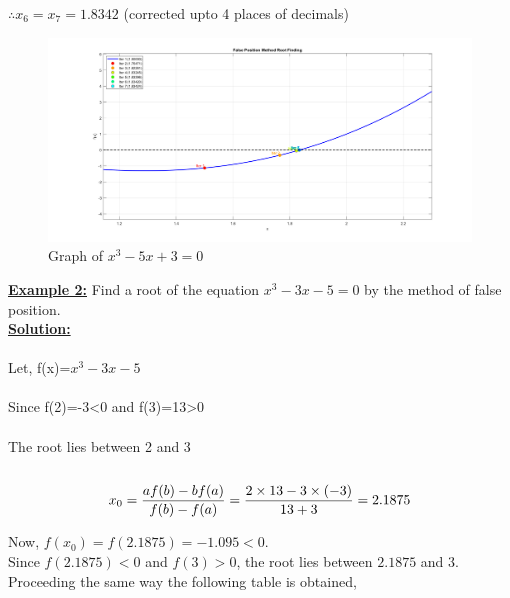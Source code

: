 \documentclass[12pt,a4paper]{article}
\begin{document}
		
		
		$\therefore x_6 = x_7 = 1.8342$ (corrected upto 4 places of decimals)
		
		\begin{figure}[h]
			\centering
			\includegraphics[width=1.2\textwidth]{False_ex01.png} %
			\caption{Graph of $x^3 - 5x + 3 = 0$}
			\label{fig:your_label_here}
		\end{figure} 
		\newpage
		
			
			\textbf{\underline{Example 2:}} Find a root of the equation $x^3-3x-5=0$ by the method of false position. \\
			
			\textbf{\underline{Solution:}}\\ \\Let,
			f(x)=$x^3-3x-5$\\\\
			Since f(2)=-3<0 and f(3)=13>0 \\\\
			The root lies between 2 and 3 \\\\
			
			
			\[
			x_0=\frac{af(b)-bf(a)}{f(b)-f(a)}
			=\frac{2\times13-3\times(-3)}{13+3}=2.1875\\
			\]
			
			Now, $f(x_0) = f(2.1875) = -1.095 < 0$.\\
			
			Since $f(2.1875) < 0$ and $f(3) > 0$, the root lies between $2.1875$ and $3$.\\
			
			Proceeding the same way the following table is obtained,\\
			
\end{document}
